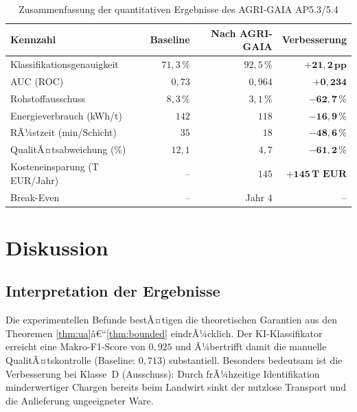 ﻿\documentclass[12pt,a4paper]{article}
\theoremstyle{plain}
\theoremstyle{definition}
\begin{document}
	\begin{table}[H]
		\centering
		\caption{Zusammenfassung der quantitativen Ergebnisse des AGRI-GAIA AP5.3/5.4}
		\label{tab:ergebnisse}
		\begin{tabular}{@{}lrrr@{}}
			\toprule
			\textbf{Kennzahl} & \textbf{Baseline} & \textbf{Nach AGRI-GAIA} &
			\textbf{Verbesserung} \\
			\midrule
			Klassifikationsgenauigkeit & $71{,}3\,\%$ & $92{,}5\,\%$
			& $\mathbf{+21{,}2\,\text{pp}}$ \\
			AUC (ROC)                  & $0{,}73$     & $0{,}964$
			& $\mathbf{+0{,}234}$ \\
			Rohstoffausschuss           & $8{,}3\,\%$  & $3{,}1\,\%$
			& $\mathbf{-62{,}7\,\%}$ \\
			Energieverbrauch (kWh/t)    & $142$        & $118$
			& $\mathbf{-16{,}9\,\%}$ \\
			RÃ¼stzeit (min/Schicht)      & $35$         & $18$
			& $\mathbf{-48{,}6\,\%}$ \\
			QualitÃ¤tsabweichung (\%)    & $12{,}1$     & $4{,}7$
			& $\mathbf{-61{,}2\,\%}$ \\
			Kosteneinsparung (T EUR/Jahr)  & --           & $145$
			& $\mathbf{+145\,\text{T EUR}}$ \\
			Break-Even                  & --           & Jahr 4 & -- \\
			\bottomrule
		\end{tabular}
	\end{table}
	
	\section{Diskussion}
	
	\subsection{Interpretation der Ergebnisse}
	
	Die experimentellen Befunde bestÃ¤tigen die theoretischen Garantien aus den
	Theoremen \ref{thm:ua}â€“\ref{thm:bounded} eindrÃ¼cklich. Der KI-Klassifikator
	erreicht eine Makro-F1-Score von $0{,}925$ und Ã¼bertrifft damit die manuelle
	QualitÃ¤tskontrolle (Baseline: $0{,}713$) substantiell. Besonders bedeutsam
	ist die Verbesserung bei Klasse~D (Ausschuss): Durch frÃ¼hzeitige Identifikation
	minderwertiger Chargen bereits beim Landwirt sinkt der nutzlose Transport
	und die Anlieferung ungeeigneter Ware.
	
\end{document}
